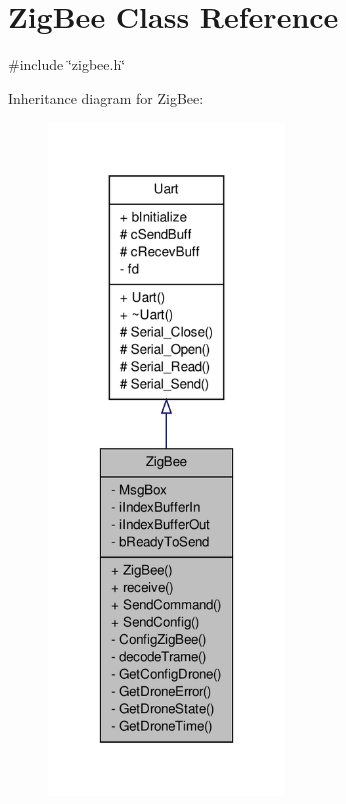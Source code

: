 \hypertarget{classZigBee}{\section{Zig\-Bee Class Reference}
\label{classZigBee}
}


{\ttfamily \#include \char`\"{}zigbee.\-h\char`\"{}}



Inheritance diagram for Zig\-Bee\-:\nopagebreak
\begin{figure}[H]
\begin{center}
\leavevmode
\includegraphics[width=178pt]{classZigBee__inherit__graph}
\end{center}
\end{figure}


